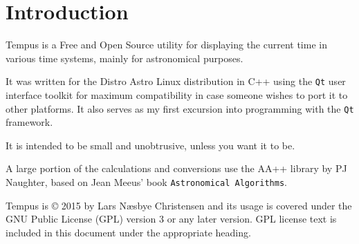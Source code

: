 \section{Introduction}
Tempus is a Free and Open Source utility for displaying the current time in various time systems, mainly for astronomical purposes.

It was written for the Distro Astro Linux distribution in C++ using the \texttt{Qt} user interface toolkit for maximum compatibility in case someone wishes to port it to other platforms.
It also serves as my first excursion into programming with the \texttt{Qt} framework.

It is intended to be small and unobtrusive, unless you want it to be.

A large portion of the calculations and conversions use the AA++ library by PJ Naughter, based on Jean Meeus' book \texttt{Astronomical Algorithms}.

Tempus is {\copyright} 2015 by Lars N{\ae}sbye Christensen and its usage is covered under the GNU Public License (GPL) version 3 or any later version. GPL license text is included in this document under the appropriate heading.

